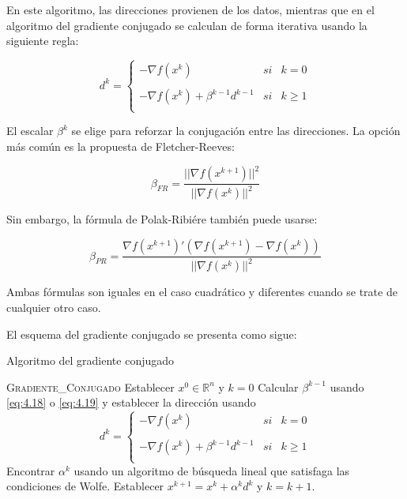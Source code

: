 En este algoritmo, las direcciones provienen de los datos, mientras que en el algoritmo del gradiente conjugado se calculan de forma iterativa usando la siguiente regla:

\begin{equation*}
d^k= \left\{ \begin{array}{lcc}
             -\nabla f(x^k) &   si  & k = 0 \\
             \\ -\nabla f(x^k)+\beta^{k-1}d^{k-1} &  si & k\geq 1 \\
             \end{array}
   \right.
\end{equation*}

El escalar $\beta^k$ se elige para reforzar la conjugación entre las direcciones. 
La opción más común es la propuesta de Fletcher-Reeves:

\begin{equation}
\beta_{FR} = \dfrac{||\nabla f(x^{k+1})||^2}{||\nabla f(x^k)||^2}
\label{eq:4.18}
\end{equation}

Sin embargo, la fórmula de Polak-Ribiére también puede usarse:

\begin{equation}
\beta_{PR} = \dfrac{\nabla f(x^{k+1})'(\nabla f(x^{k+1})-\nabla f(x^k))}{||\nabla f(x^k)||^2}
\label{eq:4.19}
\end{equation}

Ambas fórmulas son iguales en el caso cuadrático y diferentes cuando se trate de cualquier otro caso.

El esquema del gradiente conjugado se presenta como sigue:

\begin{algorithm}[H]
\caption{Algoritmo del gradiente conjugado}\label{alg:ConjugateGradiente}
\begin{algorithmic}[1]
\Procedure \textsc{Gradiente\_Conjugado}
\State Establecer $x^0\in\mathbb{R}^n$ y $k=0$
	\State Calcular $\beta^{k-1}$ usando \ref{eq:4.18} o \ref{eq:4.19} y establecer la dirección usando \begin{equation*}
d^k= \left\{ \begin{array}{lcc}
             -\nabla f(x^k) &   si  & k = 0 \\
             \\ -\nabla f(x^k)+\beta^{k-1}d^{k-1} &  si & k\geq 1 \\
             \end{array}
   \right.
\end{equation*}
	\State Encontrar $\alpha^k$ usando un algoritmo de búsqueda lineal que satisfaga las condiciones de Wolfe.
	\State Establecer $x^{k+1} = x^k + \alpha^kd^k$ y $k=k+1$.
\EndWhile
\EndProcedure
\end{algorithmic}
\end{algorithm}

